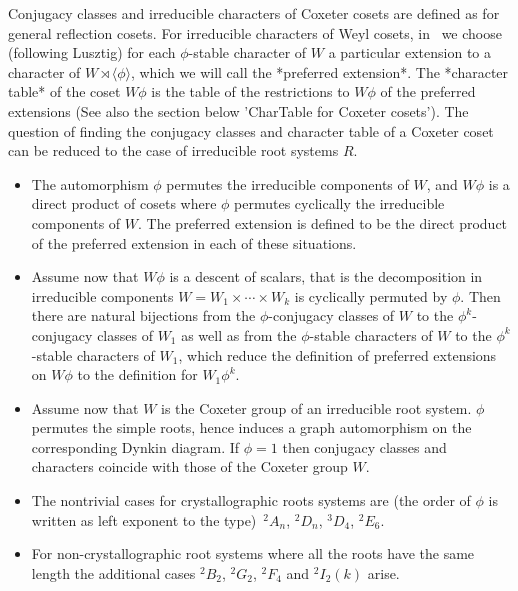 Conjugacy  classes and irreducible characters of Coxeter cosets are defined
as  for  general  reflection  cosets.  For  irreducible  characters of Weyl
cosets,  in \CHEVIE\ we  choose (following Lusztig)  for each $\phi$-stable
character  of $W$ a particular extension to a character of $W\rtimes\langle
\phi \rangle$, which we will call the *preferred extension*. The *character
table*  of the coset $W\phi$ is the table of the restrictions to $W\phi$ of
the preferred extensions (See also the section below 'CharTable for Coxeter
cosets'). The question of finding the conjugacy classes and character table
of  a Coxeter coset can be reduced  to the case of irreducible root systems
$R$.

\begin{itemize}
\item  The automorphism $\phi$ permutes  the irreducible components of $W$,
and  $W\phi$ is a direct product of cosets where $\phi$ permutes cyclically
the irreducible components of $W$. The preferred extension is defined to be
the direct product of the preferred extension in each of these situations.

\item  Assume  now  that  $W\phi$  is  a  descent  of  scalars, that is the
decomposition  in irreducible components $W=W_1\times \cdots \times W_k$ is
cyclically  permuted by $\phi$. Then there  are natural bijections from the
$\phi$-conjugacy  classes of $W$ to the $\phi^k$-conjugacy classes of $W_1$
as  well as from the $\phi$-stable characters of $W$ to the $\phi^k$-stable
characters of $W_1$, which reduce the definition of preferred extensions on
$W\phi$ to the definition for $W_1\phi^k$.

\item  Assume now  that $W$  is the  Coxeter group  of an  irreducible root
system.   $\phi$  permutes  the   simple  roots,  hence   induces  a  graph
automorphism   on  the  corresponding  Dynkin  diagram.  If  $\phi=1$  then
conjugacy  classes and characters coincide with  those of the Coxeter group
$W$.  

\item The nontrivial cases for crystallographic roots systems are (the order
of  $\phi$ is  written as  left exponent  to the type)\:\ $^2A_n$, $^2D_n$,
$^3D_4$, $^2E_6$.

\item  For non-crystallographic root  systems where all  the roots have the
same  length the additional cases  $^2B_2$, $^2G_2$, $^2F_4$ and $^2I_2(k)$
arise.


\end{itemize}
